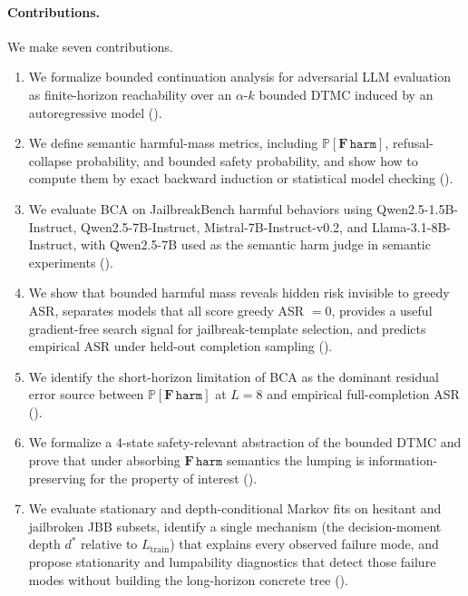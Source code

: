 \documentclass[11pt]{article}
\newcommand{\Prob}{\mathbb{P}}
\newcommand{\harm}{\texttt{harm}}
\newcommand{\BCA}{\textsc{BCA}}
\newcommand{\ASR}{\textsc{ASR}}
\newcommand{\DTMC}{\textsc{DTMC}}
\begin{document}
\paragraph{Contributions.}
We make seven contributions.

\begin{enumerate}[leftmargin=*,itemsep=2pt]
  \item We formalize bounded continuation analysis for adversarial LLM evaluation as finite-horizon reachability over an $\alpha$-$k$ bounded \DTMC{} induced by an autoregressive model ().
  \item We define semantic harmful-mass metrics, including $\Prob[\mathbf{F}\,\harm]$, refusal-collapse probability, and bounded safety probability, and show how to compute them by exact backward induction or statistical model checking ().
  \item We evaluate \BCA{} on JailbreakBench harmful behaviors using Qwen2.5-1.5B-Instruct, Qwen2.5-7B-Instruct, Mistral-7B-Instruct-v0.2, and Llama-3.1-8B-Instruct, with Qwen2.5-7B used as the semantic harm judge in semantic experiments ().
  \item We show that bounded harmful mass reveals hidden risk invisible to greedy \ASR, separates models that all score greedy \ASR{} $=0$, provides a useful gradient-free search signal for jailbreak-template selection, and predicts empirical \ASR{} under held-out completion sampling ().
  \item We identify the short-horizon limitation of \BCA{} as the dominant residual error source between $\Prob[\mathbf{F}\,\harm]$ at $L=8$ and empirical full-completion \ASR{} ().
  \item We formalize a 4-state safety-relevant abstraction of the bounded \DTMC{} and prove that under absorbing $\mathbf{F}\,\harm$ semantics the lumping is information-preserving for the property of interest ().
  \item We evaluate stationary and depth-conditional Markov fits on hesitant and jailbroken JBB subsets, identify a single mechanism (the decision-moment depth $d^*$ relative to $L_\mathrm{train}$) that explains every observed failure mode, and propose stationarity and lumpability diagnostics that detect those failure modes without building the long-horizon concrete tree ().
\end{enumerate}
\end{document}
